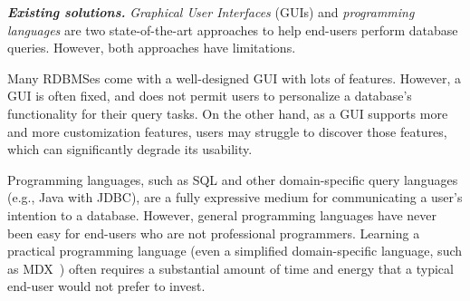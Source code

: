 








\vspace{1mm}
\noindent \textbf{\textit{Existing solutions.}}
\textit{Graphical User Interfaces} (GUIs) and \textit{programming languages}
are two state-of-the-art approaches to help end-users perform
database queries. However, both approaches have limitations.

Many RDBMSes come with a well-designed GUI with lots of features.
However, 
a GUI is often fixed, and does not permit users to personalize
a database's functionality for their query tasks. On the other hand,
as a GUI supports more and more customization features, users
may struggle to discover those features, which can significantly
degrade its usability. 

Programming languages, such as SQL and
other domain-specific query languages (e.g., Java with JDBC), 
are a fully expressive medium  for
communicating a user's intention to a database. However, 
general programming languages have never been easy for
end-users who are not professional programmers.  Learning
a practical programming language (even a simplified domain-specific language, such as MDX~\cite{mdx}) often requires a substantial amount
of time and energy that a typical end-user would not prefer to invest. 




